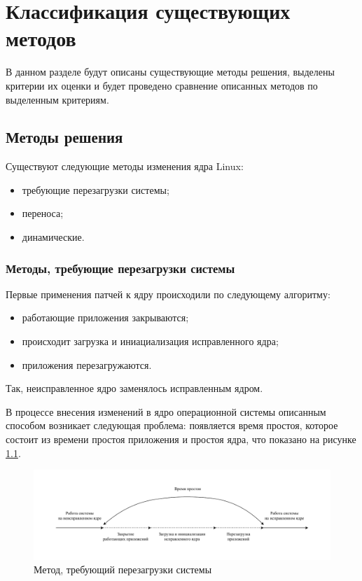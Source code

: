 \chapter{Классификация существующих методов}

В данном разделе будут описаны существующие методы решения, выделены критерии их оценки и будет проведено сравнение описанных методов по выделенным критериям.

\section{Методы решения}

Существуют следующие методы изменения ядра Linux:

\begin{itemize}
	\item требующие перезагрузки системы;
	\item переноса;
	\item динамические.
\end{itemize}

\subsection{Методы, требующие перезагрузки системы}

Первые применения патчей к ядру происходили по следующему алгоритму:

\begin{itemize}
	\item работающие приложения закрываются;
	\item происходит загрузка и иниациализация исправленного ядра;
	\item приложения перезагружаются.
\end{itemize}

Так, неисправленное ядро заменялось исправленным ядром. 

В процессе внесения изменений в ядро операционной системы описанным способом возникает следующая проблема: появляется время простоя, которое состоит из времени простоя приложения и простоя ядра, что показано на рисунке \ref{img:downtime}.

\begin{figure}[H]
	\begin{center}
		\includegraphics[scale=0.7]{img/downtime.pdf}
	\end{center}
	\captionsetup{justification=centering}
	\caption{Метод, требующий перезагрузки системы}
	\label{img:downtime}
\end{figure}

